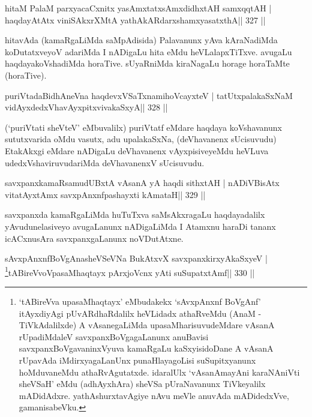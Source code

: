 
\begin{shl}
hitaM PalaM parxyacaCxnitx yasAmxtatxsAmxdidhxtAH samxqqtAH |
haqdayAtAtx viniSAkxrXMtA yathA\s kARdarxshamxyasatxthA\hfill || 327 ||
\end{shl}

\begin{artha}
hitavAda (kamaRgaLiMda saMpAdisida) Palavanunx yAva kAraNadiMda 
koDutatxveyoV adariMda I nADigaLu hita eMdu heVLalapxTiTxve. avugaLu 
haqdayakoVshadiMda horaTive. sUyaRniMda kiraNagaLu horage horaTaMte 
(horaTive). 
\end{artha}


\begin{shl}
puriVtadaBidhAneVna haqdevxVSaTxnamihoVcayxteV |
tatUtxpalakaSxNaM vidAyxdedxVhavAyxpitxvivakaSxyA\hfill || 328 ||
\end{shl}

\begin{artha}
(`puriVtati sheVteV' eMbuvalilx) puriVtatf eMdare haqdaya koVshavanunx 
sututxvarida oMdu vasutx, adu upalakaSxNa, (deVhavanenx sUcisuvudu) EtakAkxgi eMdare nADigaLu deVhavanenx vAyxpisiveyeMdu heVLuva udedxVshaviruvudariMda deVhavanenxV sUcisuvudu.
\end{artha}

\begin{shl}
savxpanxkamaRsamudUBxtA vAsanA yA haqdi sithxtAH |
nADiVBisAtx vitatAyx\s\s tAmx savxpAnxnfpashayxti  kAmataH\hfill || 329 ||
\end{shl}

\begin{artha}
savxpanxda kamaRgaLiMda huTuTxva saMsAkxragaLu haqdayadalilx yAvudu\break nelasiveyo avugaLanunx nADigaLiMda I Atamxnu haraDi tananx icACxnusAra savxpanxgaLanunx noVDutAtxne.
\end{artha}


\begin{shl}
sAvxpAnxnfBoVgAnasheVSeVNa BukAtxvX savxpanxkirxyAkaSxyeV |
\footnote{`tABireVva upasaMhaqtayx' eMbudakekx `sAvxpAnxnf  BoVgAnf' itAyxdiyAgi pUvARdhaRdalilx heVLidadx athaRveMdu (AnaM -  TiVkAdalilxde) A vAsanegaLiMda upasaMharisuvudeMdare vAsanA  rUpadiMdaleV savxpanxBoVgagaLanunx anuBavisi savxpanxBoVgavaninxVyuva  kamaRgaLu kaSxyisidoDane A vAsanA rUpavAda iMdirxyagaLanUnx  punaHlayagoLisi suSupitxyanunx hoMduvaneMdu athaRvAgutatxde. idaralUlx  `vAsanAmayAni karaNAniVti sheVSaH' eMdu (adhAyxhAra) sheVSa pUraNavanunx TiVkeyalilx mADidAdxre. yathAshurxtavAgiye nAvu meVle anuvAda mADidedxVve, gamanisabeVku.}tABireVvoVpasaMhaqtayx pArxjoVcnx yAti suSupatxtAmf\hfill || 330 ||
\end{shl}

